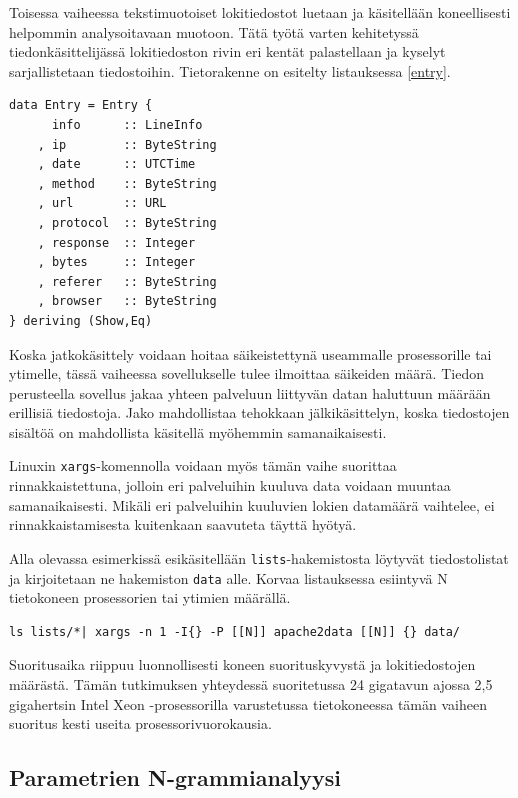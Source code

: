 Toisessa vaiheessa tekstimuotoiset lokitiedostot luetaan ja
käsitellään koneellisesti helpommin analysoitavaan muotoon. Tätä työtä
varten kehitetyssä tiedonkäsittelijässä lokitiedoston rivin eri kentät
palastellaan ja kyselyt sarjallistetaan tiedostoihin. Tietorakenne on
esitelty listauksessa \ref{entry}.

\lstset{language=MyHaskell}

\begin{lstlisting}[float=h,caption=Yhden lokirivin säilövä tietorakenne.,label=entry,aboveskip=1cm]
data Entry = Entry {
      info      :: LineInfo
    , ip        :: ByteString
    , date      :: UTCTime
    , method    :: ByteString
    , url       :: URL
    , protocol  :: ByteString
    , response  :: Integer
    , bytes     :: Integer
    , referer   :: ByteString
    , browser   :: ByteString
} deriving (Show,Eq)
\end{lstlisting}

Koska jatkokäsittely voidaan hoitaa säikeistettynä useammalle
prosessorille tai ytimelle, tässä vaiheessa sovellukselle tulee
ilmoittaa säikeiden määrä. Tiedon perusteella sovellus jakaa yhteen
palveluun liittyvän datan haluttuun määrään erillisiä tiedostoja. Jako
mahdollistaa tehokkaan jälkikäsittelyn, koska tiedostojen sisältöä on
mahdollista käsitellä myöhemmin samanaikaisesti.

Linuxin \texttt{xargs}-komennolla voidaan myös tämän vaihe suorittaa
rinnakkaistettuna, jolloin eri palveluihin kuuluva data voidaan
muuntaa samanaikaisesti. Mikäli eri palveluihin kuuluvien lokien datamäärä
vaihtelee, ei rinnakkaistamisesta kuitenkaan saavuteta täyttä hyötyä.

Alla olevassa esimerkissä esikäsitellään \texttt{lists}-hakemistosta
löytyvät tiedostolistat ja kirjoitetaan ne hakemiston \texttt{data}
alle. Korvaa listauksessa esiintyvä N tietokoneen prosessorien tai
ytimien määrällä. 

\begin{lstlisting}[language=bashshell]
ls lists/*| xargs -n 1 -I{} -P [[N]] apache2data [[N]] {} data/
\end{lstlisting}

Suoritusaika riippuu luonnollisesti koneen suorituskyvystä ja
lokitiedostojen määrästä. Tämän tutkimuksen yhteydessä suoritetussa 24
gigatavun ajossa 2,5 gigahertsin Intel Xeon -prosessorilla varustetussa
tietokoneessa tämän vaiheen suoritus kesti useita
prosessorivuorokausia.

\subsection{Parametrien N-grammianalyysi}

